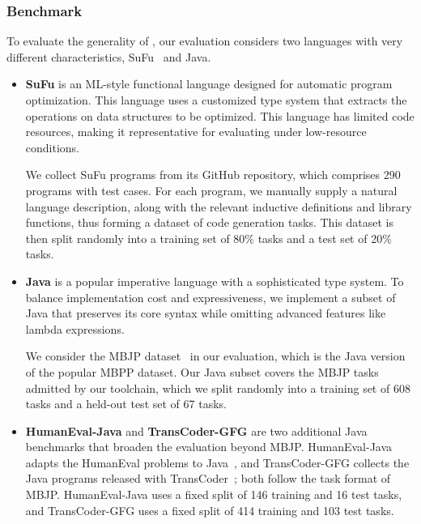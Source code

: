 \subsubsection{Benchmark}
To evaluate the generality of \mainname, our evaluation considers two languages with very different characteristics, SuFu~\cite{DBLP:journals/pacmpl/JiZPXH24} and Java.
\begin{itemize}
 \item \textbf{SuFu} is an ML-style functional language designed for automatic program optimization. This language uses a customized type system that extracts the operations on data structures to be optimized.
 This language has limited code resources, making it representative for evaluating \mainname under low-resource conditions.

 We collect SuFu programs from its GitHub repository, which comprises 290 programs with test cases. For each program, we manually supply a natural language description, along with the relevant inductive definitions and library functions, thus forming a dataset of code generation tasks.
 This dataset is then split randomly into a training set of 80\% tasks and a test set of 20\% tasks.
 
 \item \textbf{Java} is a popular imperative language with a sophisticated type system. To balance implementation cost and expressiveness, we implement a subset of Java that preserves its core syntax while omitting advanced features like lambda expressions.

 We consider the MBJP dataset~\cite{DBLP:conf/iclr/AthiwaratkunGWL23} in our evaluation, which is the Java version of the popular MBPP dataset. Our Java subset covers the MBJP tasks admitted by our toolchain, which we split randomly into a training set of 608 tasks and a held-out test set of 67 tasks.

 \item \textbf{HumanEval-Java} and \textbf{TransCoder-GFG} are two additional Java benchmarks that broaden the evaluation beyond MBJP. HumanEval-Java adapts the HumanEval problems to Java~\cite{DBLP:journals/corr/abs-2107-03374}, and TransCoder-GFG collects the Java programs released with TransCoder~\cite{DBLP:conf/nips/LachauxROC20}; both follow the task format of MBJP. 
HumanEval-Java uses a fixed split of 146 training and 16 test tasks, and TransCoder-GFG uses a fixed split of 414 training and 103 test tasks.
\end{itemize}

